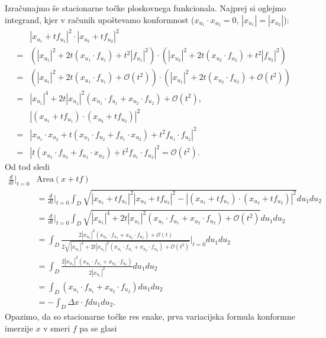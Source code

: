 \documentclass[12pt,a4paper,twoside]{article}
\theoremstyle{definition} %
\theoremstyle{plain} %
\numberwithin{equation}{section}  %
\begin{document}
Izračunajmo še stacionarne točke ploskovnega funkcionala.
Najprej si oglejmo integrand, kjer v računih upoštevamo konformnost ($x_{u_1} \cdot x_{u_2} = 0$, $|x_{u_1}| = |x_{u_2}|$):
\begin{align*}
&\left| x_{u_1}+tf_{u_1} \right|^2 \cdot \left| x_{u_2}+tf_{u_2} \right|^2 \\
= &\left( |x_{u_1}|^2 + 2t(x_{u_1} \cdot f_{u_1}) + t^2|f_{u_1}|^2 \right) \cdot \left( |x_{u_2}|^2 + 2t(x_{u_2} \cdot f_{u_2}) + t^2|f_{u_2}|^2 \right) \\
= &\left( |x_{u_1}|^2 + 2t(x_{u_1} \cdot f_{u_1}) + \mathcal{O}(t^2) \right) \cdot \left( |x_{u_1}|^2 + 2t(x_{u_2} \cdot f_{u_2}) + \mathcal{O}(t^2) \right) \\
= &\left| x_{u_1} \right|^4 + 2t \left| x_{u_1} \right|^2 \left( x_{u_1} \cdot f_{u_1} + x_{u_2} \cdot f_{u_2} \right) + \mathcal{O}(t^2), \\[5pt]
&\left| (x_{u_1}+tf_{u_1}) \cdot (x_{u_2}+tf_{u_2}) \right|^2 \\
= &\left| x_{u_1} \cdot x_{u_2} + t(x_{u_1} \cdot f_{u_2} + f_{u_1} \cdot x_{u_2}) + t^2 f_{u_1} \cdot f_{u_2} \right|^2 \\
= & \left| t(x_{u_1} \cdot f_{u_2} + f_{u_1} \cdot x_{u_2}) + t^2 f_{u_1} \cdot f_{u_2} \right|^2 = \mathcal{O}(t^2).
\end{align*}
Od tod sledi
\begin{align*}
\frac{d}{dt} \Big|_{t=0} &\text{Area}(x+tf) \\ 
	&= \frac{d}{dt} \Big|_{t=0} \int_{D} \sqrt{|x_{u_1}+tf_{u_1}|^2 |x_{u_2}+tf_{u_2}|^2 - |(x_{u_1}+tf_{u_1}) \cdot (x_{u_2}+tf_{u_2}) |^2} du_1 du_2 \\
	&= \frac{d}{dt} \Big|_{t=0} \int_{D} \sqrt{ |x_{u_1}|^4 + 2t |x_{u_1}|^2 (x_{u_1} \cdot f_{u_1} + x_{u_2} \cdot f_{u_2}) + \mathcal{O}(t^2)} du_1 du_2 \\
	&= \int_{D} \frac{2 |x_{u_1}|^2 (x_{u_1} \cdot f_{u_1} + x_{u_2} \cdot f_{u_2}) + \mathcal{O}(t)}{2 \sqrt{ |x_{u_1}|^4 + 2t |x_{u_1}|^2 (x_{u_1} \cdot f_{u_1} + x_{u_2} \cdot f_{u_2}) + \mathcal{O}(t^2)}} \bigg|_{t=0} du_1 du_2 \\
	&= \int_{D} \frac{2 |x_{u_1}|^2 (x_{u_1} \cdot f_{u_1} + x_{u_2} \cdot f_{u_2})}{2 |x_{u_1}|^2} du_1 du_2 \\
	&= \int_{D} (x_{u_1} \cdot f_{u_1} + x_{u_2} \cdot f_{u_2}) du_1 du_2 \\
	&= - \int_{D} \Delta{x} \cdot f du_1 du_2 .
\end{align*}
%
Opazimo, da so stacionarne točke res enake, prva variacijska formula konformne imerzije $x$ v smeri $f$ pa se glasi
\end{document}

